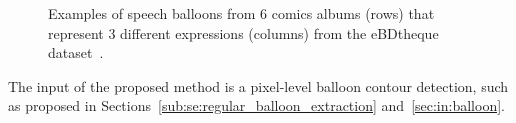 

	\begin{figure}[!ht]	%
	  \centering
		\caption[Relation between speech balloon shape and contour informations]{Examples of speech balloons from 6 comics albums (rows) that represent 3 different expressions (columns) from the eBDtheque dataset~\cite{Guerin2013}.}
		\label{fig:in:contour_style}
	\end{figure}






The input of the proposed method is a pixel-level balloon contour detection, such as proposed in Sections~\ref{sub:se:regular_balloon_extraction} and~\ref{sec:in:balloon}.

